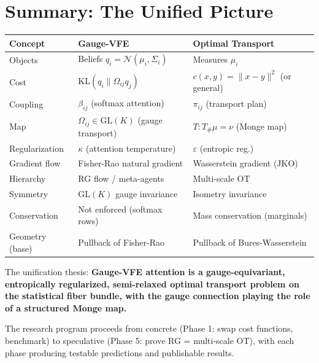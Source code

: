 \documentclass[11pt]{article}
\newcommand{\KL}{\mathrm{KL}}
\newcommand{\GL}{\mathrm{GL}}
\begin{document}
\section{Summary: The Unified Picture}

\begin{center}
\begin{tabular}{lll}
\toprule
\textbf{Concept} & \textbf{Gauge-VFE} & \textbf{Optimal Transport} \\
\midrule
Objects & Beliefs $q_i = \mathcal{N}(\mu_i, \Sigma_i)$ & Measures $\mu_i$ \\
Cost & $\KL(q_i \| \Omega_{ij}q_j)$ & $c(x,y) = \|x-y\|^2$ (or general) \\
Coupling & $\beta_{ij}$ (softmax attention) & $\pi_{ij}$ (transport plan) \\
Map & $\Omega_{ij} \in \GL(K)$ (gauge transport) & $T: T_\#\mu = \nu$ (Monge map) \\
Regularization & $\kappa$ (attention temperature) & $\varepsilon$ (entropic reg.) \\
Gradient flow & Fisher-Rao natural gradient & Wasserstein gradient (JKO) \\
Hierarchy & RG flow / meta-agents & Multi-scale OT \\
Symmetry & $\GL(K)$ gauge invariance & Isometry invariance \\
Conservation & Not enforced (softmax rows) & Mass conservation (marginals) \\
Geometry (base) & Pullback of Fisher-Rao & Pullback of Bures-Wasserstein \\
\bottomrule
\end{tabular}
\end{center}

The unification thesis: \textbf{Gauge-VFE attention is a gauge-equivariant, entropically regularized, semi-relaxed optimal transport problem on the statistical fiber bundle, with the gauge connection playing the role of a structured Monge map.}

The research program proceeds from concrete (Phase 1: swap cost functions, benchmark) to speculative (Phase 5: prove RG = multi-scale OT), with each phase producing testable predictions and publishable results.
\end{document}
